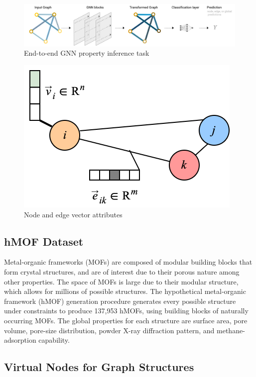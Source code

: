 \documentclass{lxaiproposal}
\begin{document}
\begin{figure}[h]
    \centering
    \includegraphics[scale=0.4]{gnn-e2e.png}
    \caption{End-to-end GNN property inference task\cite{sanchez-lengeling2021a}}
    \label{fig:e2e}
\end{figure}

\begin{figure}
    \centering
    \includegraphics[scale=0.4]{graph-rep.drawio.png}
    \caption{Node and edge vector attributes}
    \label{fig:vec-reps}
\end{figure}

\subsection*{hMOF Dataset}

Metal-organic frameworks (MOFs) are composed of modular building blocks that form crystal structures, and are of interest due to their porous nature among other properties. The space of  MOFs is large due to their modular structure, which allows for millions of possible structures. The hypothetical metal-organic framework (hMOF) generation procedure generates every possible structure under constraints to produce 137,953 hMOFs, using building blocks of naturally occurring MOFs. The global properties for each structure are surface area, pore volume, pore-size distribution, powder X-ray diffraction pattern, and methane-adsorption capability\cite{wilmer2012large}.

\subsection*{Virtual Nodes for Graph Structures}
\end{document}
